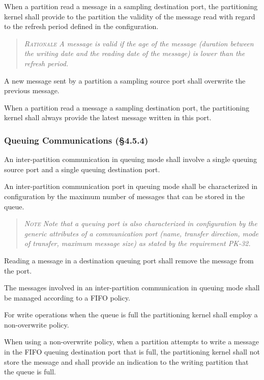 When a partition read a message in a sampling destination port, the partitioning kernel shall provide to the partition the validity of the  message read with regard to the  refresh period defined in the configuration.
\begin{quote}\it
\textsc{Rationale}
A message is valid if the age of the message (duration between the writing date and the reading date of the message) is lower than the refresh period.
\end{quote}

A new message sent by a partition a sampling source port shall overwrite the previous message.

When a partition read a message a sampling  destination port, the partitioning kernel shall always provide the latest message written  in this port.

\subsubsection{Queuing Communications (\S4.5.4)}

An inter-partition communication in queuing mode shall involve a single queuing source port and a single queuing destination port.

An inter-partition communication port in queuing mode shall be characterized in configuration by the maximum number of messages that can be stored in the queue.
\begin{quote}\it
\textsc{Note}
Note that a queuing port is also characterized in configuration by the generic attributes of a communication port (name, transfer direction, mode of transfer, maximum message size)  as stated by the requirement PK-32.
\end{quote}

Reading a message in a destination queuing port shall remove the message from the port.

The messages involved in an inter-partition communication in queuing mode shall be managed according to a FIFO policy.

For write operations when the queue is full the partitioning kernel shall employ a non-overwrite policy.

When using a non-overwrite policy, when a partition attempts to write a message in the FIFO queuing destination port that is full, the partitioning kernel shall not store the message and shall provide an indication to the writing  partition that the queue is full.

